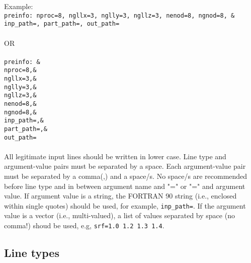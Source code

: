 Example:\\
\texttt{preinfo: nproc=8, ngllx=3, nglly=3, ngllz=3, nenod=8, ngnod=8, \& \\
inp\_path=, part\_path=, out\_path=}\\
\\
OR
\\
\\
\texttt{preinfo:   \quad\&\\
          \hspace*{18pt} nproc=8,\&\\
          \hspace*{18pt} ngllx=3,\&\\
          \hspace*{18pt} nglly=3,\&\\
          \hspace*{18pt} ngllz=3,\&\\
          \hspace*{18pt} nenod=8,\&\\
          \hspace*{18pt} ngnod=8,\&\\
          \hspace*{18pt} inp\_path=,\&\\
          \hspace*{18pt} part\_path=,\&\\
          \hspace*{18pt} out\_path=}\\
\\
All legitimate input lines should be written in lower case. Line type and argument-value pairs must be separated by a space. Each argument-value pair must be separated by a comma(,) and a space/s. No space/s are recommended before line type and in between argument name and "=" or "=" and argument value. If argument value is a string, the FORTRAN 90 string (i.e., enclosed within single quotes) should be used, for example, \texttt{inp\_path=}. If the argument value is a vector (i.e., multi-valued), a list of values separated by space (no comma!) shoud be used, e.g, \texttt{srf=1.0 1.2 1.3 1.4}.

\subsection{Line types}

